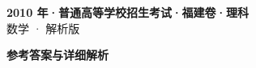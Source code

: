 \documentclass[zihao=-4, a4paper]{ctexart}
\begin{document}
\begin{center}
  {\Large\bfseries 2010 年·普通高等学校招生考试·福建卷·理科}\\[4pt]
  {\large 数学 · 解析版}
\end{center}
\medskip
{}

\clearpage
{}
\begin{center}{\Large\bfseries 参考答案与详细解析}\end{center}
\medskip

\end{document}
